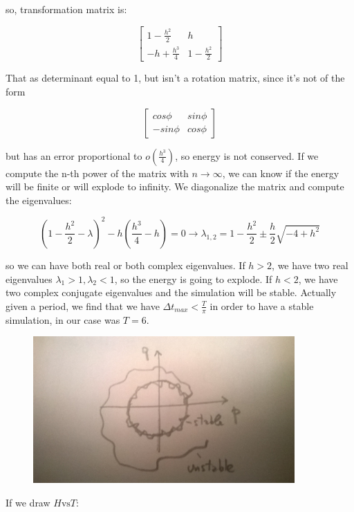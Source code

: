 \documentclass[a4paper, italian, openany]{book}
\begin{document}
so, transformation matrix is:

$$\begin{bmatrix} 1-\frac{h^2}{2} & h \\
-h +\frac{h^3}{4} & 1-\frac{h^2}{2}
\end{bmatrix}
$$

That as determinant equal to 1, but isn't a rotation matrix, since it's not of the form

$$\begin{bmatrix} cos\phi & sin\phi \\
-sin\phi & cos\phi
\end{bmatrix}
$$

but has an error proportional to $o(\frac{h^3}{4})$, so energy is not conserved. If we compute the n-th power of the matrix with $n \to \infty$, we can know if the energy will be finite or will explode to infinity.\newline
We diagonalize the matrix and compute the eigenvalues:

$$(1-\frac{h^2}{2} -\lambda)^2 - h(\frac{h^3}{4} -h) = 0 \rightarrow  \lambda_{1, 2} = 1-\frac{h^2}{2} \pm \frac{h}{2} \sqrt{-4 + h^2}$$

so we can have both real or both complex eigenvalues.\newline
If $h > 2$, we have two real eigenvalues $\lambda_1 >1, \lambda_2 <1$, so the energy is going to explode.\newline
If $h < 2$, we have two complex conjugate eigenvalues and the simulation will be stable.\newline
Actually given a period, we find that we have $\Delta t_{max} < \frac{T}{\pi}$ in order to have a stable simulation, in our case was $T = 6$.

\begin{figure}[H]
\centering
\includegraphics[width=100mm]{img/pic4.jpg}
\end{figure}

If we draw $H \mbox{vs} T$:
\end{document}

